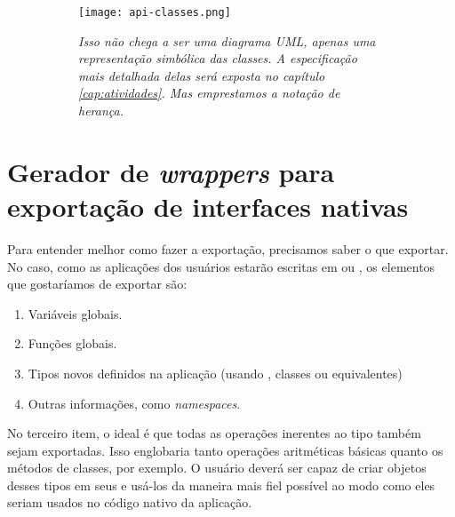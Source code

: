     \begin{figure}[ht]
      \centering
      \caption{}
      \begin{subfigure}{.8\textwidth}
        \begin{center}
          \texttt{[image: api-classes.png]}
          \vspace{1em}

          \textit{
            Isso não chega a ser uma diagrama UML, apenas uma representação
            simbólica das classes. A especificação mais detalhada delas será
            exposta no capítulo \ref{cap:atividades}. Mas emprestamos a notação
            de herança.
          }
        \end{center}
      \end{subfigure}
      \label{fig:api-classes}
    \end{figure}
  
  \section{Gerador de \textit{wrappers} para exportação de interfaces nativas}
  \label{cap:estrutura:opwig}

    Para entender melhor como fazer a exportação, precisamos saber o que
    exportar. No caso, como as aplicações dos usuários estarão escritas em \C{}
    ou \CXX{}, os elementos que gostaríamos de exportar são:

    \begin{enumerate}
      \item Variáveis globais.
      \item Funções globais.
      \item Tipos novos definidos na aplicação (usando , classes
            ou equivalentes)
          \item Outras informações, como \textit{namespaces}\footnotemark{}.
    \end{enumerate}


    No terceiro item, o ideal é que todas as operações inerentes ao tipo
    também sejam exportadas. Isso englobaria tanto operações aritméticas básicas
    quanto os métodos de classes, por exemplo. O usuário deverá ser capaz de
    criar objetos desses tipos em seus  e usá-los da maneira mais fiel
    possível ao modo como eles seriam usados no código nativo da aplicação.

